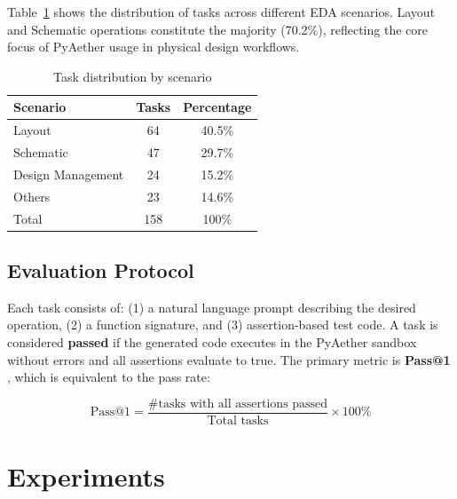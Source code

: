 \documentclass[anonymous, sigconf]{acmart}
\begin{document}
Table~\ref{tab:scenario-distribution} shows the distribution of tasks across different EDA scenarios. Layout and Schematic operations constitute the majority (70.2\%), reflecting the core focus of PyAether usage in physical design workflows.


\begin{table}[htbp]
\centering
\caption{Task distribution by scenario}
\label{tab:scenario-distribution}
\begin{tabular}{lcc}
\toprule
\textbf{Scenario} & \textbf{Tasks} & \textbf{Percentage} \\
\midrule
Layout & 64 & 40.5\% \\
Schematic & 47 & 29.7\% \\
Design Management & 24 & 15.2\% \\
Others & 23 & 14.6\% \\
\midrule
Total & 158 & 100\% \\
\bottomrule
\end{tabular}
\end{table}

\subsection{Evaluation Protocol}

Each task consists of: (1) a natural language prompt describing the desired operation, (2) a function signature, and (3) assertion-based test code. A task is considered \textbf{passed} if the generated code executes in the PyAether sandbox without errors and all assertions evaluate to true. The primary metric is \textbf{Pass@1} \cite{chen2021evaluating}, which is equivalent to the pass rate:

\[
\text{Pass@1} = \frac{\text{\# tasks with all assertions passed}}{\text{Total tasks}} \times 100\%
\]

\section{Experiments}
\label{sec:experiments}
\end{document}
